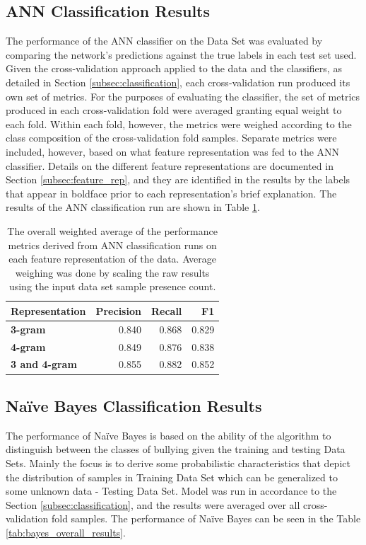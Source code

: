 \documentclass[conference]{sig-alternate-05-2015}
\begin{document}
\subsection{ANN Classification Results}\label{subsec:ann_results}
The performance of the ANN classifier on the Data Set was evaluated by comparing
the network's predictions against the true labels in each test set used. Given
the cross-validation approach applied to the data and the classifiers, as
detailed in Section \ref{subsec:classification}, each cross-validation run
produced its own set of metrics. For the purposes of evaluating the classifier,
the set of metrics produced in each cross-validation fold were averaged granting
equal weight to each fold. Within each fold, however, the metrics were weighed
according to the class composition of the cross-validation fold samples.
Separate metrics were included, however, based on what feature representation
was fed to the ANN classifier. Details on the different feature representations
are documented in Section \ref{subsec:feature_rep}, and they are identified in
the results by the labels that appear in boldface prior to each representation's
brief explanation. The results of the ANN classification run are shown in Table
\ref{tab:ann_overall_results}.

\begin{table}[ht!]
  \centering
  \begin{tabular}{| l | r | r | r |}
    \hline
    \textbf{Representation} & \textbf{Precision} & \textbf{Recall} & \textbf{F1} \\
    \hline\hline
    \textbf{3-gram} & 0.840 & 0.868 & 0.829 \\
    \hline
    \textbf{4-gram} & 0.849 & 0.876 & 0.838 \\
    \hline
    \textbf{3 and 4-gram} & 0.855 & 0.882 & 0.852 \\
    \hline
  \end{tabular}
  \caption{The overall weighted average of the performance metrics derived from
  ANN classification runs on each feature representation of the data. Average
  weighing was done by scaling the raw results using the input data set sample
  presence count.}
  \label{tab:ann_overall_results}
\end{table}

\subsection{Na\"ive Bayes Classification Results}\label{subsec:bayes_results}
The performance of Na\"ive Bayes is based on the ability of the algorithm to 
distinguish between the classes of bullying given the training and testing Data Sets.
Mainly the focus is to derive some probabilistic characteristics that depict the distribution 
of samples in Training Data Set which can be generalized to some unknown data - Testing Data Set.
Model was run in accordance to the Section \ref{subsec:classification}, and the results
were averaged over all cross-validation fold samples. The performance of Na\"ive Bayes can be 
seen in the Table \ref{tab:bayes_overall_results}.
\end{document}
